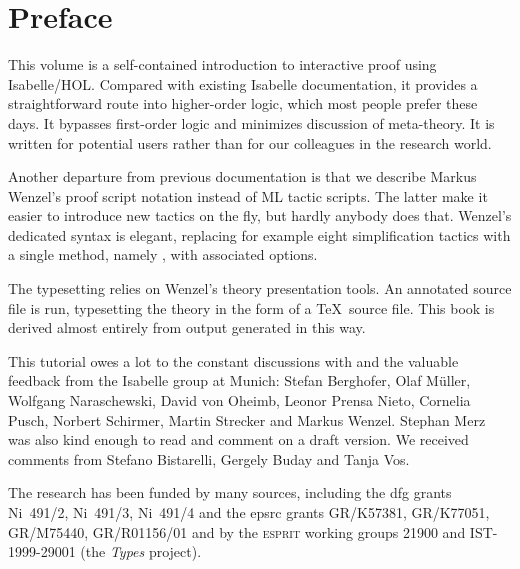 \chapter*{Preface}

This volume is a self-contained introduction to interactive proof using
Isabelle/HOL\@.  Compared with existing Isabelle documentation, it
provides a straightforward route into higher-order logic, which most
people prefer these days. It bypasses first-order logic and minimizes
discussion of meta-theory.  It is written for potential users rather
than for our colleagues in the research world.

%
Another departure from previous documentation is that we describe Markus
Wenzel's proof script notation instead of ML tactic scripts.  The latter
make it easier to introduce new tactics on the fly, but hardly anybody
does that.  Wenzel's dedicated syntax is elegant, replacing for example
eight simplification tactics with a single method, namely ,
with associated options.

The typesetting relies on Wenzel's theory presentation tools.  An
annotated source file is run, typesetting the theory
in the form of a \TeX\ source file.  This book is
derived almost entirely from output generated in this way.

This tutorial owes a lot to the constant discussions with and the valuable
feedback from the Isabelle group at Munich: Stefan Berghofer, Olaf
M{\"u}ller, Wolfgang Naraschewski, David von Oheimb, Leonor Prensa Nieto,
Cornelia Pusch, Norbert Schirmer, Martin Strecker and Markus Wenzel. Stephan
Merz was also kind enough to read and comment on a draft version.  We
received comments from Stefano Bistarelli, Gergely Buday and Tanja
Vos.

The research has been funded by many sources, including the {\sc dfg} grants
Ni~491/2, Ni~491/3, Ni~491/4 and the {\sc epsrc} grants GR\slash K57381,
GR\slash K77051, GR\slash M75440, GR\slash R01156\slash 01 and by the
\textsc{esprit} working groups 21900 and IST-1999-29001 (the \emph{Types}
project).
